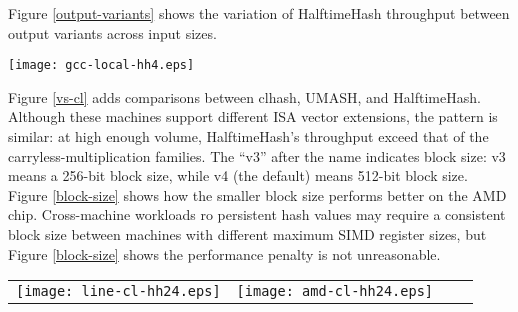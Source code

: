 \documentclass[sigconf, nonacm]{acmart}
\begin{document}



Figure \ref{output-variants} shows the variation of HalftimeHash throughput between output variants across input sizes.

\texttt{[image: gcc-local-hh4.eps]}

Figure \ref{vs-cl} adds comparisons between clhash, UMASH, and HalftimeHash.
Although these machines support different ISA vector extensions, the pattern is similar: at high enough volume, HalftimeHash's throughput exceed that of the carryless-multiplication families.
The ``v3'' after the name indicates block size: v3 means a 256-bit block size, while v4 (the default) means 512-bit block size.
Figure \ref{block-size} shows how the smaller block size performs better on the AMD chip.
Cross-machine workloads ro persistent hash values may require a consistent block size between machines with different maximum SIMD register sizes, but Figure \ref{block-size} shows the performance penalty is not unreasonable.

\begin{figure*}
\begin{tabular}{cccc}
\texttt{[image: line-cl-hh24.eps]}
&
\texttt{[image: amd-cl-hh24.eps]}
\end{tabular}
\caption{
  \label{vs-cl}
  Comparison of Intel (i7-7800x) and AMD (EC2 c5a.large, 7R32 chip) performance.
  These AMD chips do not support AVX-512, but still HalftimeHash with 256-bit registers exceeds the speed of clmul-based hashing methods by up to a factor of two on long strings.
  In both cases, for long strings, HalftimeHash with 24 bytes of output is faster than clhash and UMASH.
  HalftimeHash24 also has lower collision probability.
  For long strings, the incremental cost of hashing the 24 bytes down to 8 with tabulation hashing is insignificant.
}
\end{figure*}
\end{document}
